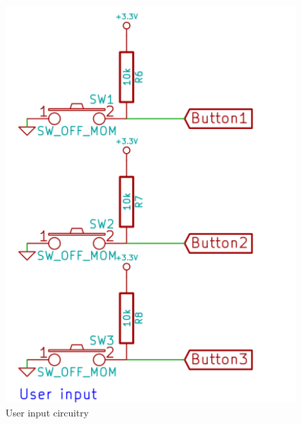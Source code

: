 \documentclass{article}
\begin{document}
\begin{figure}[H]
\centering
\includegraphics[width=140mm,angle=0]{../images/userinput.png}
\caption{User input circuitry}
\label{}
\end{figure}


\section{} \label{}

\section{} \label{}

\section{} \label{}

\section{} \label{}
\end{document}
